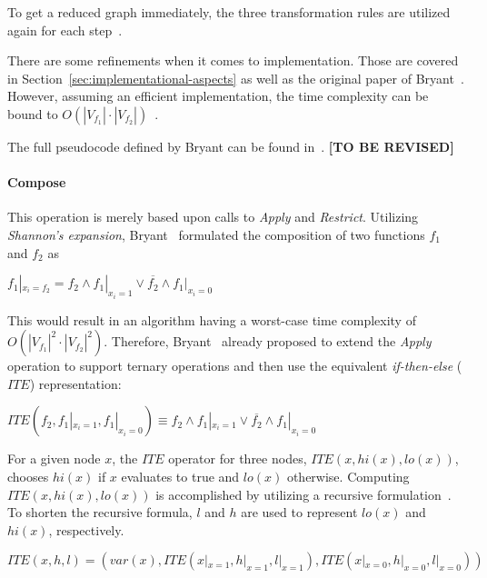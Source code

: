 \documentclass{vldb}
\newcommand{\tbr}{\textbf{[TO BE REVISED]}}
\begin{document}
To get a reduced graph immediately, the three transformation rules are utilized
again for each step~\cite{BRYANT92}.

There are some refinements when it comes to implementation. Those are covered in
Section~\ref{sec:implementational-aspects} as well as the original paper of
Bryant~\cite{BRYANT86, BRYANT92}.  However, assuming an efficient implementation,
the time complexity can be bound to
$O\left(|V_{f_1}| \cdot |V_{f_2}|\right)$~\cite{BRYANT86, BRYANT92}.

The full pseudocode defined by Bryant can be found in~\cite[p. 685]{BRYANT86}. \tbr

\paragraph*{Compose}
\mbox{} %

This operation is merely based upon calls to \textit{Apply} and \textit{Restrict}.
Utilizing \textit{Shannon's expansion}, Bryant~\cite{BRYANT86} formulated the
composition of two functions $f_1$ and $f_2$ as
\begin{center}
$
f_1|_{x_i=f_2}=
f_2 \land f_1|_{x_i=1} \lor \overline{f_2} \land f_1|_{x_i=0}
$
\end{center}

This would result in an algorithm having a worst-case time complexity of 
$O\left(|V_{f_1}|^2 \cdot |V_{f_2}|^2\right)$. Therefore, Bryant~\cite{BRYANT86}
already proposed to extend the \textit{Apply} operation to support ternary
operations and then use the equivalent \textit{if-then-else} ($ITE$)
representation:
\begin{center}
$
ITE\left(f_2, f_1|_{x_i=1}, f_1|_{x_i=0}\right) \equiv
f_2 \land f_1|_{x_i=1} \lor \overline{f_2} \land f_1|_{x_i=0}
$
\end{center}

\noindent
For a given node $x$, the $ITE$ operator for three nodes, \newline
$ITE(x, hi(x), lo(x))$, chooses $hi(x)$ if $x$ evaluates to true and $lo(x)$
otherwise. Computing $ITE(x, hi(x), lo(x))$ is accomplished by utilizing a
recursive formulation~\cite{BRACE90}. To shorten the recursive formula, $l$ and
$h$ are used to represent $lo(x)$ and $hi(x)$, respectively.
\begin{center}
$
ITE(x, h, l) =
(var(x), ITE(x|_{x=1}, h|_{x=1}, l|_{x=1}), ITE(x|_{x=0}, h|_{x=0}, l|_{x=0}))
$
\end{center}
\end{document}
